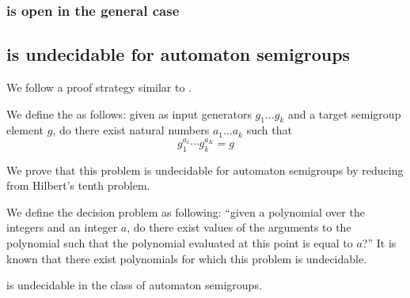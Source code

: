 \documentclass[11pt]{article}
\begin{document}
\subsubsection{ is open in the general case}

\subsection{ is undecidable for automaton semigroups}
We follow a proof strategy similar to \cite{Konig15:knapsack}.

We define the  as follows: given as input
generators $g_1 \ldots g_k$ and a target semigroup element $g$, do there
exist natural numbers $a_1\ldots a_k$ such that
\[ g_1^{a_1} \cdots g_k^{a_K} = g \]


We prove that this problem is undecidable for automaton semigroups by
reducing from Hilbert's tenth problem.

We define the decision problem  as following: ``given
a polynomial over the integers and an integer $a$, do there exist
values of the arguments to the polynomial such that the polynomial
evaluated at this point is equal to $a$?'' It is known that there
exist polynomials for which this problem is undecidable.

\begin{theorem}
   is undecidable in the class of automaton semigroups.
\end{theorem}
\end{document}
